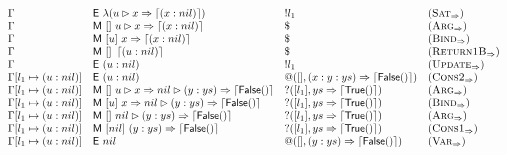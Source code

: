 \begin{figure*}
\[\begin{array}{llll}
            \Gamma                                  & \textsf{E}~\lambda(u\rhd x \Rightarrow \left\lceil (x : nil)\right\rceil)    & !l_1                                     & (\textsc{Sat}_{\Rightarrow})      \\
            \Gamma                                  & \textsf{M}~[]~u\rhd x \Rightarrow \left\lceil (x : nil)\right\rceil         & \$                                       & (\textsc{Arg}_{\Rightarrow})      \\
            \Gamma                                  & \textsf{M}~[u]~x \Rightarrow \left\lceil (x : nil)\right\rceil                      & \$                                       & (\textsc{Bind}_{\Rightarrow})     \\
            \Gamma                                  & \textsf{M}~[]~\left\lceil (u : nil)\right\rceil                        & \$                                       & (\textsc{Return1B}_{\Rightarrow}) \\
            \Gamma                                  & \textsf{E}~(u : nil)                                           & !l_1                                     & (\textsc{Update}_{\Rightarrow})   \\
            \Gamma[l_1\mapsto(u : nil)]
                                                    & \textsf{E}~(u : nil)                                           & @([],(x : y : ys) \Rightarrow \left\lceil \textsf{False}{}(\right)\rceil) & (\textsc{Cons2}_{\Rightarrow})    \\
            \Gamma[l_1\mapsto(u : nil)]             & \textsf{M}~[]~u\rhd x \Rightarrow nil\rhd (y : ys) \Rightarrow \left\lceil \textsf{False}{}(\right)\rceil
                                                    & ?([l_1],ys \Rightarrow \left\lceil \textsf{True}{}(\right)\rceil)                           & (\textsc{Arg}_{\Rightarrow})                                                 \\
            \Gamma[l_1\mapsto(u : nil)]             & \textsf{M}~[u]~x \Rightarrow nil\rhd (y : ys) \Rightarrow \left\lceil \textsf{False}{}(\right)\rceil
                                                    & ?([l_1],ys \Rightarrow \left\lceil \textsf{True}{}(\right)\rceil)                           & (\textsc{Bind}_{\Rightarrow})                                                \\
            \Gamma[l_1\mapsto(u : nil)]             & \textsf{M}~[]~nil\rhd (y : ys) \Rightarrow \left\lceil \textsf{False}{}(\right)\rceil
                                                    & ?([l_1],ys \Rightarrow \left\lceil \textsf{True}{}(\right)\rceil)                           & (\textsc{Arg}_{\Rightarrow})                                                 \\
            \Gamma[l_1\mapsto(u : nil)]             & \textsf{M}~[nil]~(y : ys) \Rightarrow \left\lceil \textsf{False}{}(\right)\rceil              & ?([l_1],ys \Rightarrow \left\lceil \textsf{True}{}(\right)\rceil)         & (\textsc{Cons1}_{\Rightarrow})    \\
            \Gamma[l_1\mapsto(u : nil)]             & \textsf{E}~nil                                                 & @([],(y : ys) \Rightarrow \left\lceil \textsf{False}{}(\right)\rceil)     & (\textsc{Var}_{\Rightarrow})      \\

\end{array}\]
\end{figure*}
